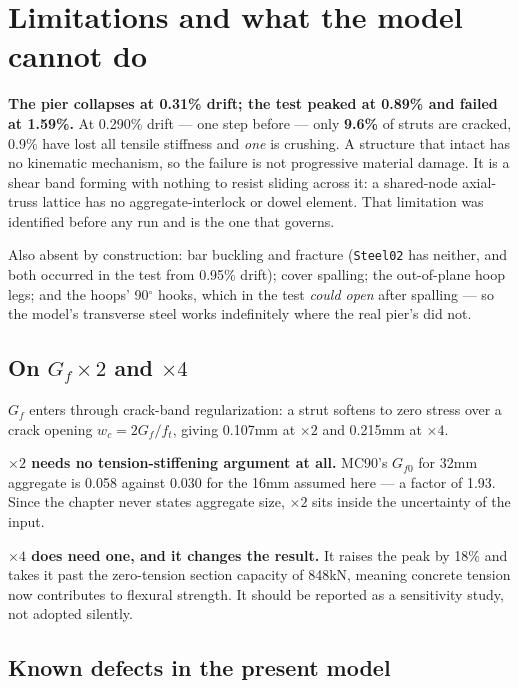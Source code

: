 \documentclass[11pt,a4paper]{article}
\begin{document}
\section{Limitations and what the model cannot do}\label{sec:limit}

\textbf{The pier collapses at 0.31\% drift; the test peaked at 0.89\% and failed at 1.59\%.} At
0.290\% drift --- one step before --- only \textbf{9.6\%} of struts are cracked, 0.9\% have lost all
tensile stiffness and \emph{one} is crushing. A structure that intact has no kinematic mechanism, so
the failure is not progressive material damage. It is a shear band forming with nothing to resist
sliding across it: a shared-node axial-truss lattice has no aggregate-interlock or dowel element.
That limitation was identified before any run and is the one that governs.

Also absent by construction: bar buckling and fracture (\texttt{Steel02} has neither, and both
occurred in the test from 0.95\% drift); cover spalling; the out-of-plane hoop legs; and the hoops'
90$^\circ$ hooks, which in the test \emph{could open} after spalling --- so the model's transverse
steel works indefinitely where the real pier's did not.

\subsection{On $G_f\times2$ and $\times4$}\label{sec:gf}

$G_f$ enters through crack-band regularization: a strut softens to zero stress over a crack opening
$w_c=2G_f/f_t$, giving 0.107\unit{mm} at $\times2$ and 0.215\unit{mm} at $\times4$.

\textbf{$\times2$ needs no tension-stiffening argument at all.} MC90's $G_{f0}$ for 32\unit{mm}
aggregate is 0.058 against 0.030 for the 16\unit{mm} assumed here --- a factor of 1.93. Since the
chapter never states aggregate size, $\times2$ sits inside the uncertainty of the input.

\textbf{$\times4$ does need one, and it changes the result.} It raises the peak by 18\% and takes it
past the zero-tension section capacity of 848\unit{kN}, meaning concrete tension now contributes to
flexural strength. It should be reported as a sensitivity study, not adopted silently.

\subsection{Known defects in the present model}
\end{document}
